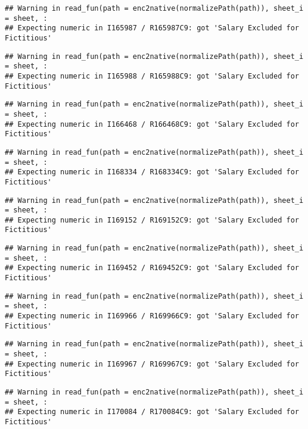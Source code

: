 \documentclass[
]{article}
\begin{document}
\begin{verbatim}
## Warning in read_fun(path = enc2native(normalizePath(path)), sheet_i = sheet, :
## Expecting numeric in I165987 / R165987C9: got 'Salary Excluded for Fictitious'
\end{verbatim}

\begin{verbatim}
## Warning in read_fun(path = enc2native(normalizePath(path)), sheet_i = sheet, :
## Expecting numeric in I165988 / R165988C9: got 'Salary Excluded for Fictitious'
\end{verbatim}

\begin{verbatim}
## Warning in read_fun(path = enc2native(normalizePath(path)), sheet_i = sheet, :
## Expecting numeric in I166468 / R166468C9: got 'Salary Excluded for Fictitious'
\end{verbatim}

\begin{verbatim}
## Warning in read_fun(path = enc2native(normalizePath(path)), sheet_i = sheet, :
## Expecting numeric in I168334 / R168334C9: got 'Salary Excluded for Fictitious'
\end{verbatim}

\begin{verbatim}
## Warning in read_fun(path = enc2native(normalizePath(path)), sheet_i = sheet, :
## Expecting numeric in I169152 / R169152C9: got 'Salary Excluded for Fictitious'
\end{verbatim}

\begin{verbatim}
## Warning in read_fun(path = enc2native(normalizePath(path)), sheet_i = sheet, :
## Expecting numeric in I169452 / R169452C9: got 'Salary Excluded for Fictitious'
\end{verbatim}

\begin{verbatim}
## Warning in read_fun(path = enc2native(normalizePath(path)), sheet_i = sheet, :
## Expecting numeric in I169966 / R169966C9: got 'Salary Excluded for Fictitious'
\end{verbatim}

\begin{verbatim}
## Warning in read_fun(path = enc2native(normalizePath(path)), sheet_i = sheet, :
## Expecting numeric in I169967 / R169967C9: got 'Salary Excluded for Fictitious'
\end{verbatim}

\begin{verbatim}
## Warning in read_fun(path = enc2native(normalizePath(path)), sheet_i = sheet, :
## Expecting numeric in I170084 / R170084C9: got 'Salary Excluded for Fictitious'
\end{verbatim}
\end{document}
